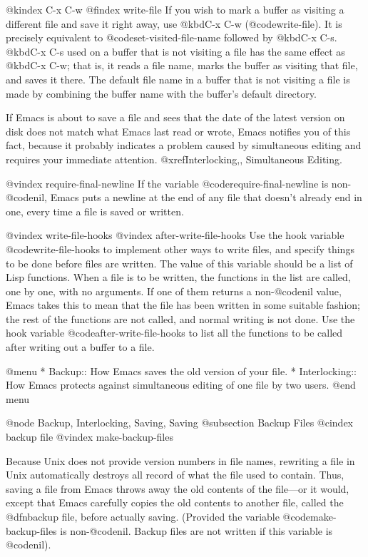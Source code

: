 {{{{{{{{{{{{{{{{@kindex C-x C-w
@findex write-file
  If you wish to mark a buffer as visiting a different file and save it
right away, use @kbd{C-x C-w} (@code{write-file}).  It is precisely
equivalent to @code{set-visited-file-name} followed by @kbd{C-x C-s}.
@kbd{C-x C-s} used on a buffer that is not visiting  a file has the
same effect as @kbd{C-x C-w}; that is, it reads a file name, marks the
buffer as visiting that file, and saves it there.  The default file name in
a buffer that is not visiting a file is made by combining the buffer name
with the buffer's default directory.

  If Emacs is about to save a file and sees that the date of the latest
version on disk does not match what Emacs last read or wrote, Emacs
notifies you of this fact, because it probably indicates a problem caused
by simultaneous editing and requires your immediate attention.
@xref{Interlocking,, Simultaneous Editing}.

@vindex require-final-newline
  If the variable @code{require-final-newline} is non-@code{nil}, Emacs
puts a newline at the end of any file that doesn't already end in one,
every time a file is saved or written.

@vindex write-file-hooks
@vindex after-write-file-hooks
  Use the hook variable @code{write-file-hooks} to implement other ways
to write files, and specify things to be done before files are written.  The
value of this variable should be a list of Lisp functions.  When a file
is to be written, the functions in the list are called, one by one, with
no arguments.  If one of them returns a non-@code{nil} value, Emacs
takes this to mean that the file has been written in some suitable
fashion; the rest of the functions are not called, and normal writing is
not done. Use the hook variable @code{after-write-file-hooks} to list
all the functions to be called after writing out a buffer to a file.

@menu
* Backup::       How Emacs saves the old version of your file.
* Interlocking:: How Emacs protects against simultaneous editing
                  of one file by two users.
@end menu

@node Backup, Interlocking, Saving, Saving
@subsection Backup Files
@cindex backup file
@vindex make-backup-files

  Because Unix does not provide version numbers in file names, rewriting a
file in Unix automatically destroys all record of what the file used to
contain.  Thus, saving a file from Emacs throws away the old contents of
the file---or it would, except that Emacs carefully copies the old contents
to another file, called the @dfn{backup} file, before actually saving.
(Provided the variable @code{make-backup-files} is non-@code{nil}.
Backup files are not written if this variable is @code{nil}).

}}}}}}}}}}}}}}}}
